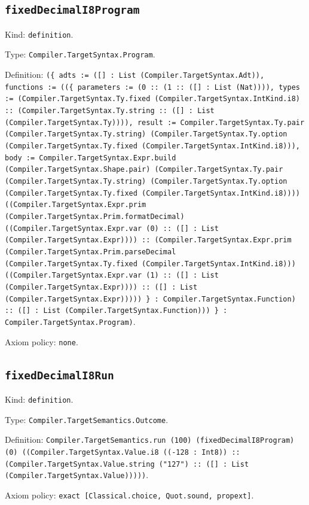\documentclass[11pt]{article}
\begin{document}
\subsection*{\texttt{fixedDecimalI8Program}}
\noindent Kind: \texttt{definition}.\par
\noindent Type: \texttt{Compiler.TargetSyntax.Program}.\par
\noindent Definition: \texttt{(\{ adts := ([] : List (Compiler.TargetSyntax.Adt)), functions := ((\{ parameters := (0 :: (1 :: ([] : List (Nat)))), types := (Compiler.TargetSyntax.Ty.fixed (Compiler.TargetSyntax.IntKind.i8) :: (Compiler.TargetSyntax.Ty.string :: ([] : List (Compiler.TargetSyntax.Ty)))), result := Compiler.TargetSyntax.Ty.pair (Compiler.TargetSyntax.Ty.string) (Compiler.TargetSyntax.Ty.option (Compiler.TargetSyntax.Ty.fixed (Compiler.TargetSyntax.IntKind.i8))), body := Compiler.TargetSyntax.Expr.build (Compiler.TargetSyntax.Shape.pair) (Compiler.TargetSyntax.Ty.pair (Compiler.TargetSyntax.Ty.string) (Compiler.TargetSyntax.Ty.option (Compiler.TargetSyntax.Ty.fixed (Compiler.TargetSyntax.IntKind.i8)))) ((Compiler.TargetSyntax.Expr.prim (Compiler.TargetSyntax.Prim.formatDecimal) ((Compiler.TargetSyntax.Expr.var (0) :: ([] : List (Compiler.TargetSyntax.Expr)))) :: (Compiler.TargetSyntax.Expr.prim (Compiler.TargetSyntax.Prim.parseDecimal (Compiler.TargetSyntax.Ty.fixed (Compiler.TargetSyntax.IntKind.i8))) ((Compiler.TargetSyntax.Expr.var (1) :: ([] : List (Compiler.TargetSyntax.Expr)))) :: ([] : List (Compiler.TargetSyntax.Expr))))) \} : Compiler.TargetSyntax.Function) :: ([] : List (Compiler.TargetSyntax.Function))) \} : Compiler.TargetSyntax.Program)}.\par
\noindent Axiom policy: \texttt{none}.\par
\subsection*{\texttt{fixedDecimalI8Run}}
\noindent Kind: \texttt{definition}.\par
\noindent Type: \texttt{Compiler.TargetSemantics.Outcome}.\par
\noindent Definition: \texttt{Compiler.TargetSemantics.run (100) (fixedDecimalI8Program) (0) ((Compiler.TargetSyntax.Value.i8 ((-128 : Int8)) :: (Compiler.TargetSyntax.Value.string ("127") :: ([] : List (Compiler.TargetSyntax.Value)))))}.\par
\noindent Axiom policy: \texttt{exact [Classical.choice, Quot.sound, propext]}.\par
\end{document}
